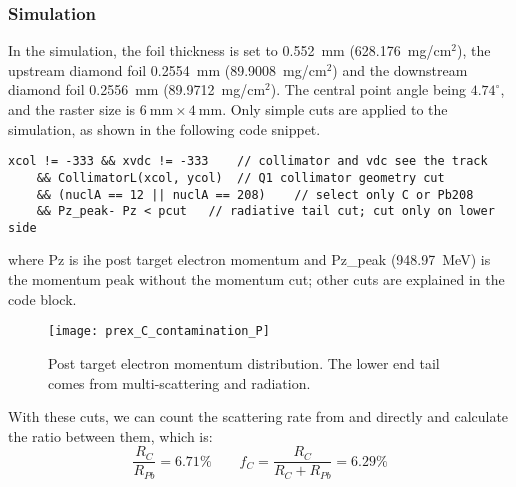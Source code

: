 \subsubsection{Simulation}
In the simulation, the \Pb foil thickness is set to 0.552~mm (628.176~mg/$\mathrm{cm}^2$), 
the upstream diamond foil 0.2554~mm (89.9008~mg/$\mathrm{cm}^2$) and the downstream diamond 
foil 0.2556~mm (89.9712~mg/$\mathrm{cm}^2$). The central point angle being $4.74^\circ$,
and the raster size is $6\ \mathrm{mm} \times 4\ \mathrm{mm}$. 
Only simple cuts are applied to the simulation, as shown in the following code
snippet.
\begin{lstlisting}[style=C]
    xcol != -333 && xvdc != -333    // collimator and vdc see the track
    && CollimatorL(xcol, ycol)	// Q1 collimator geometry cut
    && (nuclA == 12 || nuclA == 208)	// select only C or Pb208
    && Pz_peak- Pz < pcut	// radiative tail cut; cut only on lower side
\end{lstlisting}
where Pz is ihe post target electron momentum and Pz\_peak (948.97~MeV) 
is the momentum peak without the momentum cut; other cuts are explained in the
code block. 

\begin{figure}[H]
    \centering
    \texttt{[image: prex\_C\_contamination\_P]}
    \caption{Post target electron momentum distribution. The lower end tail comes 
    from multi-scattering and radiation.}
\end{figure}

With these cuts, we can count the scattering rate from \Carbon and \Pb directly 
and calculate the ratio between them, which is:
\begin{equation}
    \frac{R_C}{R_{Pb}} = 6.71\%	\qquad f_C = \frac{R_C}{R_C + R_{Pb}} = 6.29\%
\end{equation}

